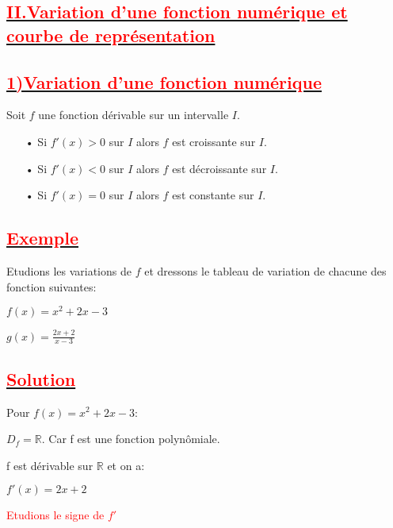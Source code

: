 \documentclass[12pt]{article}
\begin{document}
\subsection*{\underline{\textbf{\textcolor{red}{II.Variation d'une fonction numérique et courbe de représentation}}}}
\subsection*{\underline{\textbf{\textcolor{red}{1)Variation d'une fonction numérique}}}}
Soit $f$ une fonction dérivable sur un intervalle $I$.
\begin{enumerate}
\item[•] Si $f'(x)>0$ sur $I$ alors $f$ est croissante sur $I$.
\item[•] Si $f'(x)<0$ sur $I$ alors $f$ est décroissante sur $I$.
\item[•] Si $f'(x)=0$ sur $I$ alors $f$ est constante sur $I$.
\end{enumerate}
\subsection*{\underline{\textbf{\textcolor{red}{Exemple}}}}
Etudions les variations de $f$ et dressons le tableau de variation de chacune des fonction suivantes:

$f(x)=x^{2}+2x-3$

$g(x)=\frac{2x+2}{x-3}$
\subsection*{\underline{\textbf{\textcolor{red}{Solution}}}}
Pour $f(x)=x^{2}+2x-3$:

$D_{f}=\mathbb{R}$. Car f est une fonction polynômiale.

f est dérivable sur $\mathbb{R}$ et on a:

$f'(x)=2x+2$

\textcolor{red}{Etudions le signe de $f'$}
\end{document}
